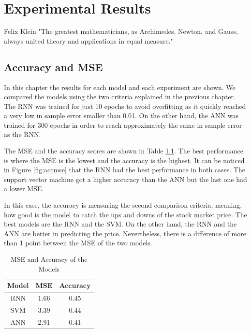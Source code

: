 \chapter{Experimental Results}
\label{ch:expResults}
\begin{chapterquote}{Felix Klein}
"The greatest mathematicians, as Archimedes, Newton, and Gauss, always united theory and applications in equal measure."
\end{chapterquote}

\section{Accuracy and MSE}
In this chapter the results for each model and each experiment are shown. We compared the models using the two criteria explained in the previous chapter. The RNN was trained for just 10 epochs to avoid overfitting as it quickly reached a very low in sample error smaller than 0.01. On the other hand, the ANN was trained for 300 epochs in order to reach approximately the same in sample error as the RNN. 


The MSE and the accuracy scores are shown in Table \ref{table:accmse}. The best performance is where the MSE is the lowest and the accuracy is the highest. It can be noticed in Figure \ref{fig:accmse} that the RNN had the best performance in both cases. The support vector machine got a higher accuracy than the ANN but the last one had a lower MSE.

In this case, the accuracy is measuring the second comparison criteria, meaning, how good is the model to catch the ups and downs of the stock market price. The best models are the RNN and the SVM. On the other hand, the RNN and the ANN are better in predicting the price. Nevertheless, there is a difference of more than 1 point between the MSE of the two models.  

\begin{table}{}
\begin{center}
\begin{tabular}{ c | c | c }
    \hline
     \textbf{Model} &  \textbf{MSE} &    \textbf{Accuracy}\\ \hline
    RNN&  1.66&  0.45 \\ \hline
    SVM&  3.39&  0.44\\ \hline
    ANN&  2.91&  0.41\\ \hline
      \hline
  \end{tabular}
  \caption{MSE and Accuracy of the Models}
 \label{table:accmse}
\end{center}
 \end{table}

